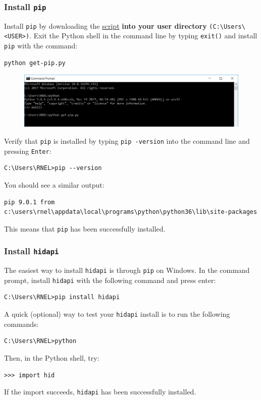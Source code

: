 \documentclass[10pt,oneside,a4paper]{article}
\begin{document}
\subsubsection{Install \texttt{pip}}
Install \texttt{pip} by downloading the \href{https://bootstrap.pypa.io/get-pip.py}{\color{blue}script} \textbf{into your user directory} \texttt{(C:\textbackslash Users\textbackslash <USER>)}. Exit the Python shell in the command line by typing \texttt{exit()} and install \texttt{pip} with the command:
\begin{verbatim}
python get-pip.py
\end{verbatim}
\begin{figure}[H]
\includegraphics[width=\textwidth]{pip.png}
\end{figure}
Verify that \texttt{pip} is installed by typing \texttt{pip -version} into the command line and pressing \texttt{Enter}:
\begin{verbatim}
C:\Users\RNEL>pip --version
\end{verbatim}
You should see a similar output:
\begin{verbatim}
pip 9.0.1 from c:\users\rnel\appdata\local\programs\python\python36\lib\site-packages
\end{verbatim}
This means that \texttt{pip} has been successfully installed.
\subsubsection{Install \texttt{hidapi}}
The easiest way to install \texttt{hidapi} is through \texttt{pip} on Windows. In the command prompt, install  \texttt{hidapi} with the following command and press enter:
\begin{verbatim}
C:\Users\RNEL>pip install hidapi
\end{verbatim}
A quick (optional) way to test your \texttt{hidapi} install is to run the following commands:
\begin{verbatim}
C:\Users\RNEL>python
\end{verbatim}
Then, in the Python shell, try:
\begin{verbatim}
>>> import hid
\end{verbatim}
If the import succeeds, \texttt{hidapi} has been successfully installed.
\end{document}
